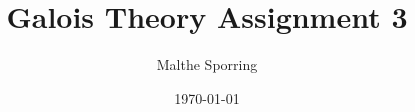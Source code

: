 \documentclass[12pt,a4paper]{article}
\title{Galois Theory Assignment 3}
\author{Malthe Sporring}
\date{\today}
\numberwithin{thm}{section}
\theoremstyle{plain}
\theoremstyle{definition}
\begin{document}
{
\let\clearpage\relax
\maketitle
}


%
\end{document}
